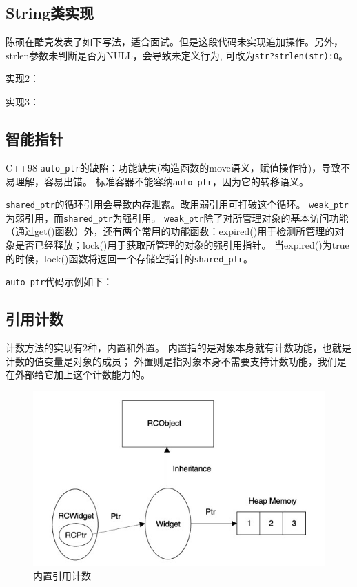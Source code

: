 \subsection{String类实现}
陈硕在酷壳发表了如下写法，适合面试。但是这段代码未实现追加操作。另外，strlen参数未判断是否为NULL，会导致未定义行为,
可改为\verb$str?strlen(str):0$。



实现2：


实现3：


\subsection{智能指针}

C++98 \verb$auto_ptr$的缺陷：功能缺失(构造函数的move语义，赋值操作符)，导致不易理解，容易出错。
标准容器不能容纳\verb$auto_ptr$，因为它的转移语义。

\verb$shared_ptr$的循环引用会导致内存泄露。改用弱引用可打破这个循环。
\verb$weak_ptr$为弱引用，而\verb$shared_ptr$为强引用。
\verb$weak_ptr$除了对所管理对象的基本访问功能（通过get()函数）外，还有两个常用的功能函数：expired()用于检测所管理的对象是否已经释放；lock()用于获取所管理的对象的强引用指针。
当expired()为true的时候，lock()函数将返回一个存储空指针的\verb$shared_ptr$。

\verb$auto_ptr$代码示例如下：


\subsection{引用计数}

计数方法的实现有2种，内置和外置。
内置指的是对象本身就有计数功能，也就是计数的值变量是对象的成员；
外置则是指对象本身不需要支持计数功能，我们是在外部给它加上这个计数能力的。

\begin{figure}[ht]
	\begin{center}
		\includegraphics[keepaspectratio,width=0.4\paperwidth]{Pictures/RCObject.jpg}
	\caption{内置引用计数}
	\label{fig:RCObject}
	\end{center}
\end{figure}

